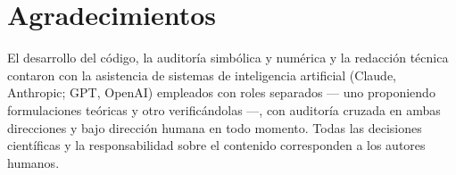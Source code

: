 \documentclass[aps,prd,twocolumn,superscriptaddress,nofootinbib,floatfix]{revtex4-2}
\begin{document}
\section*{Agradecimientos}

El desarrollo del c\'odigo, la auditor\'ia simb\'olica y num\'erica y la
redacci\'on t\'ecnica contaron con la asistencia de sistemas de
inteligencia artificial (Claude, Anthropic; GPT, OpenAI) empleados con
roles separados --- uno proponiendo formulaciones te\'oricas y otro
verific\'andolas ---, con auditor\'ia cruzada en ambas direcciones y
bajo direcci\'on humana en todo momento. Todas las decisiones
cient\'ificas y la responsabilidad sobre el contenido corresponden a los
autores humanos.
\end{document}

